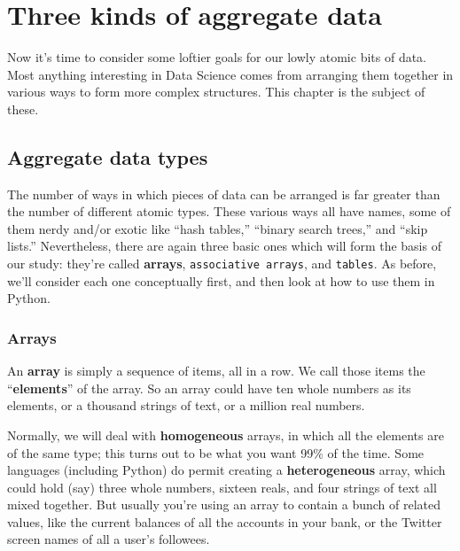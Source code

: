 
%

\chapter{Three kinds of aggregate data}

Now it's time to consider some loftier goals for our lowly atomic bits of data.
Most anything interesting in Data Science comes from arranging them together in
various ways to form more complex structures. This chapter is the subject of
these.

\section{Aggregate data types}

The number of ways in which pieces of data can be arranged is far greater than
the number of different atomic types. These various ways all have names, some
of them nerdy and/or exotic like ``hash tables,'' ``binary search trees,'' and
``skip lists.'' Nevertheless, there are again three basic ones which will form
the basis of our study: they're called \textbf{arrays}, \texttt{associative
arrays}, and \texttt{tables}. As before, we'll consider each one conceptually
first, and then look at how to use them in Python.

\subsection{Arrays}

An \textbf{array} is simply a sequence of items, all in a row. We call those
items the ``\textbf{elements}'' of the array. So an array could have ten whole
numbers as its elements, or a thousand strings of text, or a million real
numbers.

Normally, we will deal with \textbf{homogeneous} arrays, in which all the
elements are of the same type; this turns out to be what you want 99\% of the
time. Some languages (including Python) do permit creating a
\textbf{heterogeneous} array, which could hold (say) three whole numbers,
sixteen reals, and four strings of text all mixed together. But usually you're
using an array to contain a bunch of related values, like the current balances
of all the accounts in your bank, or the Twitter screen names of all a user's
followees.

